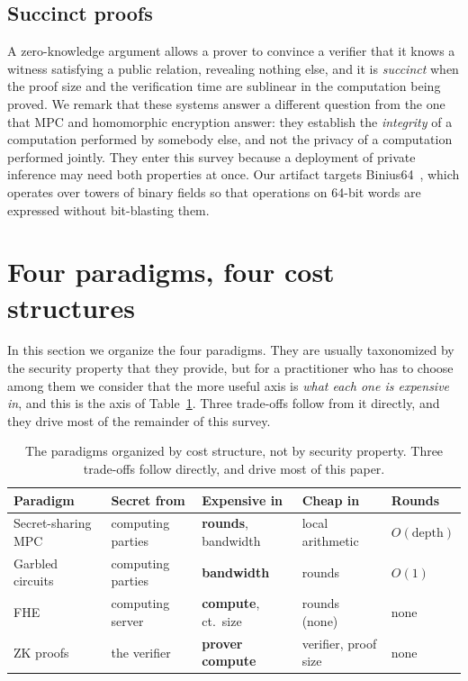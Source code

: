 \documentclass[11pt]{article}
\begin{document}
\subsection{Succinct proofs}
\label{sec:prelim:zk}

A zero-knowledge argument allows a prover to convince a verifier that it knows a witness
satisfying a public relation, revealing nothing else, and it is \emph{succinct} when the proof
size and the verification time are sublinear in the computation being proved. We remark that
these systems answer a different question from the one that MPC and homomorphic encryption
answer: they establish the \emph{integrity} of a computation performed by somebody else, and
not the privacy of a computation performed jointly. They enter this survey because a
deployment of private inference may need both properties at once. Our artifact targets
Binius64~\cite{Binius}, which operates over towers of binary fields so that operations on
64-bit words are expressed without bit-blasting them.

\section{Four paradigms, four cost structures}
\label{sec:background}

In this section we organize the four paradigms. They are usually taxonomized by the
security property that they provide, but for a practitioner who has to choose among them we
consider that the more useful axis is \emph{what each one is expensive in}, and this is the
axis of Table~\ref{tab:paradigms}. Three trade-offs follow from it directly, and they drive
most of the remainder of this survey.

\begin{table}[t]
\centering
\small
\begin{tabular}{@{}lllll@{}}
\toprule
Paradigm & Secret from & Expensive in & Cheap in & Rounds \\
\midrule
Secret-sharing MPC & computing parties & \textbf{rounds}, bandwidth & local arithmetic & $O(\text{depth})$ \\
Garbled circuits   & computing parties & \textbf{bandwidth} & rounds & $O(1)$ \\
FHE                & computing server  & \textbf{compute}, ct.\ size & rounds (none) & none \\
ZK proofs          & the verifier      & \textbf{prover compute} & verifier, proof size & none \\
\bottomrule
\end{tabular}
\caption{The paradigms organized by cost structure, not by security property. Three trade-offs follow directly, and drive most of this paper.}
\label{tab:paradigms}
\end{table}
\end{document}
